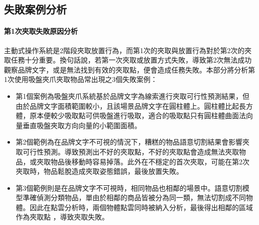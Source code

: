 \subsection{失敗案例分析}

\paragraph{第1次夾取失敗原因分析} 主動式操作系統是2階段夾取放置行為，而第1次的夾取與放置行為對於第2次的夾取任務十分重要。換句話說，若第一次夾取或放置方式失敗，導致第2次無法成功觀察品牌文字，或是無法找到有效的夾取點，便會造成任務失敗。本部分將分析第1次使用吸盤夾爪夾取物品常出現之3個失敗案例：
\begin{itemize}
\item 第1個案例為吸盤夾爪系統基於品牌文字為線索進行夾取可行性預測結果，但由於品牌文字面積範圍較小，且該場景品牌文字在圓柱體上。圓柱體比起長方體，原本便較少吸取點可供吸盤進行吸取，適合的吸取點只有圓柱體曲面法向量垂直吸盤夾取方向向量的小範圍面積。
\item 第2個範例為在品牌文字不可視的情況下，糟糕的物品語意切割結果會影響夾取可行性預測。導致預測出不好的夾取點，不好的夾取點會造成無法夾取物品，或夾取物品後移動時容易掉落。此外在不穩定的首次夾取，可能在第2次夾取時，物品鬆脫造成夾取姿態錯誤，最後放置失敗。
\item 第3個範例則是在品牌文字不可視時，相同物品也相鄰的場景中。語意切割模型準確偵測分類物品，單由於相鄰的商品皆被分為同一類，無法切割成不同物體。因此在點雲分析時，兩個物體點雲同時被納入分析，最後得出相鄰的區域作為夾取點
，導致夾取失敗。
\end{itemize}

